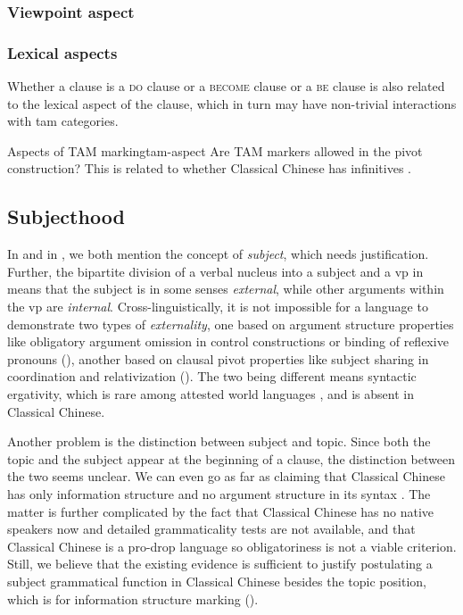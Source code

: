 \documentclass[UTF8, a4paper, oneside, scheme=plain, 12pt]{ctexrep}
\newcommand*{\citepage}[1]{p.~{#1}}
\newcommand*{\term}[1]{\emph{#1}}
\newcommand*{\category}[1]{\textsc{#1}}
\begin{document}
\subsubsection{Viewpoint aspect}



\subsubsection{Lexical aspects}

Whether a clause is a \category{do} clause or a \category{become} clause or a \category{be} clause
is also related to the lexical aspect of the clause,
which in turn may have non-trivial interactions with \ac{tam} categories.

\begin{todobox}{Aspects of TAM marking}{tam-aspect}
    Are TAM markers allowed in the pivot construction?
    This is related to whether Classical Chinese has infinitives \citep[\citepage{375}]{meiguang2018}.
\end{todobox}

\subsection{Subjecthood}\label{sec:grammatical.verbal.subject}

In  and in ,
we both mention the concept of \term{subject},
which needs justification.
Further, the bipartite division of a verbal nucleus into a subject and a \ac{vp} in  means that
the subject is in some senses \emph{external},
while other arguments within the \ac{vp} are \emph{internal}.
Cross-linguistically, it is not impossible for a language to demonstrate two types of \term{externality},
one based on argument structure properties like obligatory argument omission in control constructions
or binding of reflexive pronouns
(),
another based on clausal pivot properties like subject sharing in coordination and relativization
().
The two being different means syntactic ergativity,
which is rare among attested world languages \citep{aldridge2008generative},
and is absent in Classical Chinese.

Another problem is the distinction between subject and topic.
Since both the topic and the subject appear at the beginning of a clause,
the distinction between the two seems unclear.
We can even go as far as claiming that 
Classical Chinese has only information structure and no argument structure in its syntax
\citep[\citepage{122}]{meiguang2018}.
The matter is further complicated by the fact that Classical Chinese has no native speakers now
and detailed grammaticality tests are not available,
and that Classical Chinese is a pro-drop language 
so obligatoriness is not a viable criterion.
Still, we believe that the existing evidence is sufficient to justify postulating a subject grammatical function in Classical Chinese
besides the topic position, which is for information structure marking
().
\end{document}
